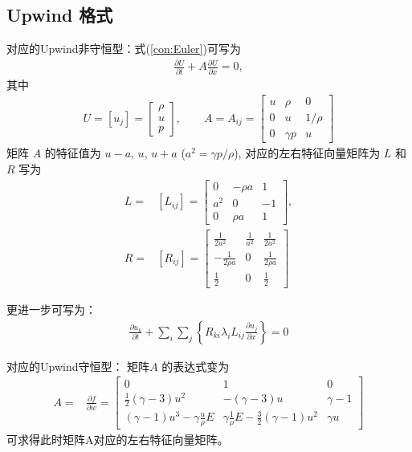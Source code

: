 \documentclass{article}
\begin{document}
\subsection{Upwind 格式}
对应的Upwind非守恒型：式(\ref{con:Euler})可写为
\begin{align}
\frac{\partial U}{\partial t} + A \frac{\partial U}{\partial x} = 0,
\end{align}
其中
\begin{align}
U = [u_j] = \left[\begin{array}{c}\rho\\ u\\ p\end{array}\right], \qquad A = A_{ij} = \left[\begin{array}{ccc}u & \rho & 0\\
0 & u & 1/\rho\\ 0 & \gamma p & u\end{array}\right]
\end{align}
矩阵 $A$ 的特征值为 $u-a$, $u$, $u+a$ ($a^2 = \gamma p/\rho$), 对应的左右特征向量矩阵为 $L$ 和 $R$ 写为
\begin{align}
L =& [L_{ij}] = \left[\begin{array}{ccc}0 & -\rho a & 1\\ a^2 & 0 & -1\\ 0 & \rho a & 1\end{array}\right],
\\
R =& [R_{ij}] = \left[\begin{array}{ccc}\frac{1}{2a^2} & \frac{1}{a^2} & \frac{1}{2a^2}\\
-\frac{1}{2\rho a} & 0 & \frac{1}{2\rho a}\\ \frac{1}{2} & 0 & \frac{1}{2}\end{array}\right]
\end{align}
\par
更进一步可写为：
\begin{align}
\frac{\partial u_k}{\partial t} + \sum_i \sum_j \left\{R_{ki} \lambda_i L_{ij} \frac{\partial
u_j}{\partial x}\right\} = 0\label{con:next}
\end{align}
\par
对应的Upwind守恒型：
矩阵$A$ 的表达式变为
\begin{align*}
A =& \frac{\partial f}{\partial w} = \left[\begin{array}{ccc} 0 & 1 & 0
\\
\frac{1}{2} (\gamma  - 3) u^2 & -(\gamma - 3) u & \gamma - 1
\\
(\gamma - 1) u^3 - \gamma \frac{u}{\rho} E & \gamma \frac{1}{\rho} E-\frac{3}{2} (\gamma
- 1) u^2 & \gamma u
\end{array}
\right]
\end{align*}
可求得此时矩阵A对应的左右特征向量矩阵。
\end{document}
